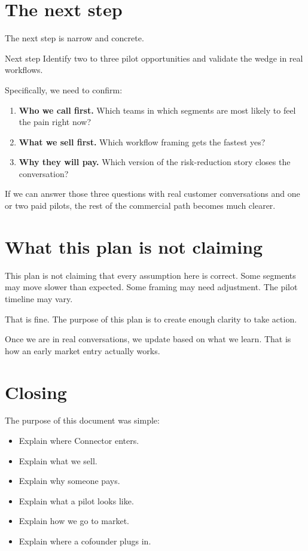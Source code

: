 \section{The next step}

The next step is narrow and concrete.

\begin{conceptbox}{Next step}
Identify two to three pilot opportunities and validate the wedge in real workflows.
\end{conceptbox}

Specifically, we need to confirm:

\begin{enumerate}
  \item \textbf{Who we call first.} Which teams in which segments are most likely to feel the pain right now?
  \item \textbf{What we sell first.} Which workflow framing gets the fastest yes?
  \item \textbf{Why they will pay.} Which version of the risk-reduction story closes the conversation?
\end{enumerate}

If we can answer those three questions with real customer conversations and one or two paid pilots, the rest of the commercial path becomes much clearer.

\section{What this plan is not claiming}

This plan is not claiming that every assumption here is correct.
Some segments may move slower than expected.
Some framing may need adjustment.
The pilot timeline may vary.

That is fine.
The purpose of this plan is to create enough clarity to take action.

Once we are in real conversations, we update based on what we learn.
That is how an early market entry actually works.

\section{Closing}

The purpose of this document was simple:

\begin{itemize}
  \item Explain where Connector enters.
  \item Explain what we sell.
  \item Explain why someone pays.
  \item Explain what a pilot looks like.
  \item Explain how we go to market.
  \item Explain where a cofounder plugs in.
\end{itemize}

